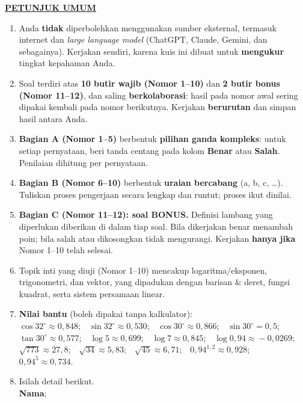 \documentclass[11pt]{article}
\begin{document}
\noindent\textbf{\underline{PETUNJUK UMUM}}
\begin{enumerate}[leftmargin=*,itemsep=3pt,topsep=3pt]
  \item Anda \textbf{tidak} diperbolehkan menggunakan sumber eksternal, termasuk
        internet dan \textit{large language model} (ChatGPT, Claude, Gemini, dan
        sebagainya). Kerjakan sendiri, karena kuis ini dibuat untuk
        \textbf{mengukur} tingkat kepahaman Anda.
  \item Soal terdiri atas \textbf{10 butir wajib (Nomor 1--10)} dan \textbf{2 butir
        bonus (Nomor 11--12)}, dan saling \textbf{berkolaborasi}: hasil pada nomor
        awal sering dipakai kembali pada nomor berikutnya. Kerjakan
        \textbf{berurutan} dan simpan hasil antara Anda.
  \item \textbf{Bagian A (Nomor 1--5)} berbentuk \textbf{pilihan ganda kompleks}:
        untuk setiap pernyataan, beri tanda centang pada kolom \textbf{Benar}
        atau \textbf{Salah}. Penilaian dihitung per pernyataan.
  \item \textbf{Bagian B (Nomor 6--10)} berbentuk \textbf{uraian bercabang}
        (a, b, c, \ldots). Tuliskan proses pengerjaan secara lengkap dan runtut;
        proses ikut dinilai.
  \item \textbf{Bagian C (Nomor 11--12): soal BONUS.} Definisi lambang yang
        diperlukan diberikan di dalam tiap soal. Bila dikerjakan benar menambah
        poin; bila salah atau dikosongkan tidak mengurangi. Kerjakan
        \textbf{hanya jika} Nomor 1--10 telah selesai.
  \item Topik inti yang diuji (Nomor 1--10) mencakup logaritma/eksponen,
        trigonometri, dan vektor, yang dipadukan dengan barisan \& deret, fungsi
        kuadrat, serta sistem persamaan linear.
  \item \textbf{Nilai bantu} (boleh dipakai tanpa kalkulator):\\[0.2em]
        \small
        $\cos 32^\circ\!\approx\!0{,}848$;\ \ $\sin 32^\circ\!\approx\!0{,}530$;\ \
        $\cos 30^\circ\!\approx\!0{,}866$;\ \ $\sin 30^\circ\!=\!0{,}5$;\ \
        $\tan 30^\circ\!\approx\!0{,}577$;\ \
        $\log 5\!\approx\!0{,}699$;\ \ $\log 7\!\approx\!0{,}845$;\ \
        $\log 0{,}94\!\approx\!-0{,}0269$;\\[0.2em]
        $\sqrt{773}\!\approx\!27{,}8$;\ \ $\sqrt{34}\!\approx\!5{,}83$;\ \
        $\sqrt{45}\!\approx\!6{,}71$;\ \ $0{,}94^{1{,}2}\!\approx\!0{,}928$;\ \
        $0{,}94^{5}\!\approx\!0{,}734$.
  \item Isilah detail berikut.\\[0.3em]
        \textbf{Nama}\hspace{0.45cm};\enspace\underline{\hspace{8cm}}
\end{enumerate}
\end{document}
